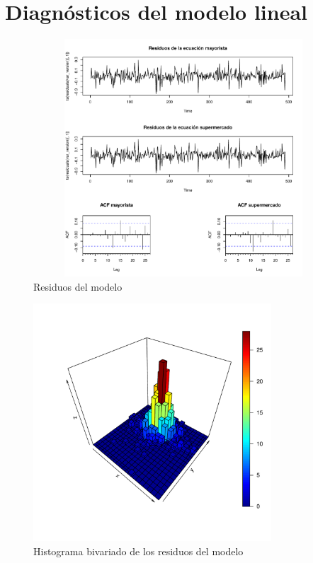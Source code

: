 \documentclass[12pt, twoside]{book}\usepackage[]{graphicx}\usepackage[]{color}
\newenvironment{knitrout}{}{} %
\numberwithin{equation}{section}
\numberwithin{theorem}{section}
\numberwithin{teorema}{section}
\numberwithin{defi}{section}
\numberwithin{prop}{section}
\numberwithin{defi}{section}
\theoremstyle{plain}
\begin{document}
\section{Diagnósticos del modelo lineal}

\begin{knitrout}
\color{fgcolor}\begin{figure}[H]

{\centering \includegraphics[width=4.5in,height=3.5in]{figure/graph5_8-1} 

}

\caption{Residuos del modelo\label{graph5.8}}\label{fig:graph5.8}
\end{figure}


\end{knitrout}




\begin{knitrout}
\color{fgcolor}\begin{figure}[H]

{\centering \includegraphics[width=3.5in,height=3.5in]{figure/fig-5_3_1-1} 

}

\caption[Histograma bivariado de los residuos del modelo]{Histograma bivariado de los residuos del modelo}\label{fig:fig-5.3.1}
\end{figure}


\end{knitrout}
\end{document}
